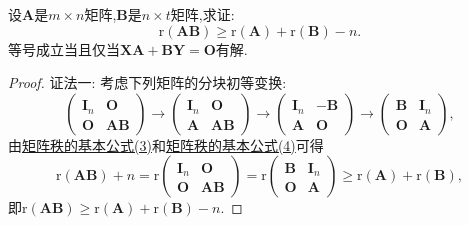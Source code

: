 \documentclass[../../main.tex]{subfiles}%
\begin{document}
\begin{proposition}\label{proposition:Sylvester(西尔维斯特)不等式}
设$\boldsymbol{A}$是$m\times n$矩阵,$\boldsymbol{B}$是$n\times t$矩阵,求证:
\[
\mathrm{r}(\boldsymbol{A}\boldsymbol{B})\geqslant \mathrm{r}(\boldsymbol{A})+\mathrm{r}(\boldsymbol{B}) - n.
\]
等号成立当且仅当$\boldsymbol{X}\boldsymbol{A}+\boldsymbol{B}\boldsymbol{Y}=\boldsymbol{O}$有解.
\end{proposition}
\begin{proof}

{\color{blue}证法一:}
考虑下列矩阵的分块初等变换:
\[
\begin{pmatrix}
\boldsymbol{I}_n&\boldsymbol{O}\\
\boldsymbol{O}&\boldsymbol{A}\boldsymbol{B}
\end{pmatrix}\to
\begin{pmatrix}
\boldsymbol{I}_n&\boldsymbol{O}\\
\boldsymbol{A}&\boldsymbol{A}\boldsymbol{B}
\end{pmatrix}\to
\begin{pmatrix}
\boldsymbol{I}_n&-\boldsymbol{B}\\
\boldsymbol{A}&\boldsymbol{O}
\end{pmatrix}\to
\begin{pmatrix}
\boldsymbol{B}&\boldsymbol{I}_n\\
\boldsymbol{O}&\boldsymbol{A}
\end{pmatrix},
\]
由\hyperref[矩阵秩的基本公式3]{矩阵秩的基本公式(3)}和\hyperref[矩阵秩的基本公式4]{矩阵秩的基本公式(4)}可得
\[
\mathrm{r}(\boldsymbol{A}\boldsymbol{B}) + n=\mathrm{r}\begin{pmatrix}
\boldsymbol{I}_n&\boldsymbol{O}\\
\boldsymbol{O}&\boldsymbol{A}\boldsymbol{B}
\end{pmatrix}=\mathrm{r}\begin{pmatrix}
\boldsymbol{B}&\boldsymbol{I}_n\\
\boldsymbol{O}&\boldsymbol{A}
\end{pmatrix}\geqslant \mathrm{r}(\boldsymbol{A})+\mathrm{r}(\boldsymbol{B}),
\]
即\(\mathrm{r}(\boldsymbol{A}\boldsymbol{B})\geqslant \mathrm{r}(\boldsymbol{A})+\mathrm{r}(\boldsymbol{B}) - n\).


\end{proof}
\end{document}
